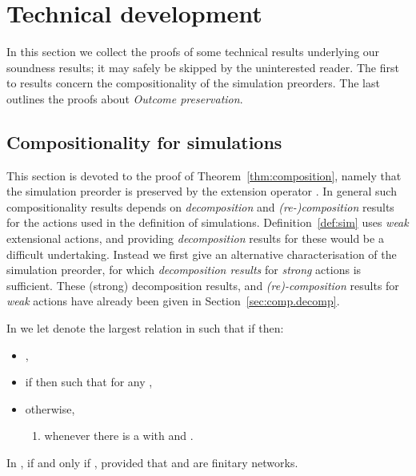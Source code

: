 \documentclass{LMCS}
\begin{document}
\section{Technical development}
\label{sec:technical}
In this section we collect the proofs of some technical results underlying our soundness
results; it may safely be skipped by the uninterested reader. 
The first to results concern the compositionality of the simulation preorders. The last 
outlines the proofs about \emph{Outcome preservation}. 
\subsection{Compositionality for  simulations}
\label{sec:technical.may.comp}

This section is devoted to the proof of Theorem~\ref{thm:composition}, namely
that the simulation preorder is preserved by  the extension operator . 
In general such compositionality results depends on \emph{decomposition} and \emph{(re-)composition}
results for the actions used in the definition of simulations. Definition~\ref{def:sim} 
uses \emph{weak} extensional actions, and providing \emph{decomposition} results for 
these would be a  difficult undertaking. Instead we  first give an alternative 
characterisation of the simulation preorder, for which \emph{decomposition results} for
\emph{strong} actions is sufficient. These (strong) decomposition results, and 
\emph{(re)-composition} results for \emph{weak} actions have already been given in 
Section~\ref{sec:comp.decomp}. 


\begin{defi}\rm\label{def:sims}
In   we let 
  denote the largest relation in 
such that if  then: 
\begin{itemize}
\item ,
\item 
if   then 
such that  for any ,

\item otherwise, 
 \begin{enumerate}[label=(\roman*)]
  \item whenever 
  there is a  with
   and .
 \end{enumerate}
  
\end{itemize}
\end{defi}

\begin{thm}\label{thm:altchar}
  In  ,
 if and only if , 
  provided that  and  are finitary networks.
\end{thm}
\end{document}
